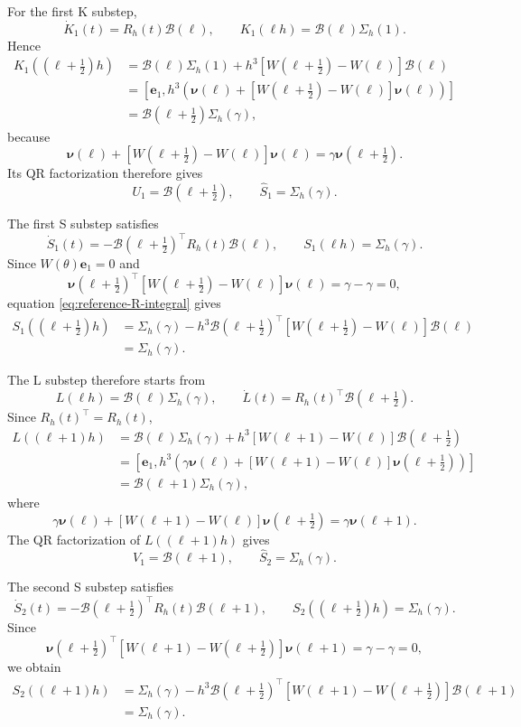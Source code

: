 \documentclass[10pt,a4paper]{amsart}
\numberwithin{equation}{section}
\begin{document}
For the first K substep,
\[
 \dot K_1(t)=R_h(t)\mathcal B(\ell),
 \qquad K_1(\ell h)=\mathcal B(\ell)\Sigma_h(1).
\]
Hence
\begin{align*}
 K_1((\ell+\tfrac12)h)
 &=\mathcal B(\ell)\Sigma_h(1)+h^3
 [W(\ell+\tfrac12)-W(\ell)]\mathcal B(\ell)\\
 &=\left[\boldsymbol e_1,
 h^3\left(\boldsymbol\nu(\ell)
 +[W(\ell+\tfrac12)-W(\ell)]\boldsymbol\nu(\ell)\right)\right]\\
 &=\mathcal B(\ell+\tfrac12)\Sigma_h(\gamma),
\end{align*}
because
\[
 \boldsymbol\nu(\ell)+
 [W(\ell+\tfrac12)-W(\ell)]\boldsymbol\nu(\ell)
 =\gamma\boldsymbol\nu(\ell+\tfrac12).
\]
Its QR factorization therefore gives
\[
 U_1=\mathcal B(\ell+\tfrac12),
 \qquad \widehat S_1=\Sigma_h(\gamma).
\]

The first S substep satisfies
\[
 \dot S_1(t)
 =-\mathcal B(\ell+\tfrac12)^\top R_h(t)\mathcal B(\ell),
 \qquad S_1(\ell h)=\Sigma_h(\gamma).
\]
Since $W(\theta)\boldsymbol e_1=0$ and
\[
 \boldsymbol\nu(\ell+\tfrac12)^\top
 [W(\ell+\tfrac12)-W(\ell)]\boldsymbol\nu(\ell)
 =\gamma-\gamma=0,
\]
equation \eqref{eq:reference-R-integral} gives
\begin{align*}
 S_1((\ell+\tfrac12)h)
 &=\Sigma_h(\gamma)-h^3\mathcal B(\ell+\tfrac12)^\top
 [W(\ell+\tfrac12)-W(\ell)]\mathcal B(\ell)\\
 &=\Sigma_h(\gamma).
\end{align*}

The L substep therefore starts from
\[
 L(\ell h)=\mathcal B(\ell)\Sigma_h(\gamma),
 \qquad \dot L(t)=R_h(t)^\top \mathcal B(\ell+\tfrac12).
\]
Since $R_h(t)^\top=R_h(t)$,
\begin{align*}
 L((\ell+1)h)
 &=\mathcal B(\ell)\Sigma_h(\gamma)+h^3
 [W(\ell+1)-W(\ell)]\mathcal B(\ell+\tfrac12)\\
 &=\left[\boldsymbol e_1,
 h^3\left(\gamma\boldsymbol\nu(\ell)
 +[W(\ell+1)-W(\ell)]\boldsymbol\nu(\ell+\tfrac12)\right)\right]\\
 &=\mathcal B(\ell+1)\Sigma_h(\gamma),
\end{align*}
where
\[
 \gamma\boldsymbol\nu(\ell)+
 [W(\ell+1)-W(\ell)]\boldsymbol\nu(\ell+\tfrac12)
 =\gamma\boldsymbol\nu(\ell+1).
\]
The QR factorization of $L((\ell+1)h)$ gives
\[
 V_1=\mathcal B(\ell+1),
 \qquad \widehat S_2=\Sigma_h(\gamma).
\]

The second S substep satisfies
\[
 \dot S_2(t)
 =-\mathcal B(\ell+\tfrac12)^\top R_h(t)\mathcal B(\ell+1),
 \qquad S_2((\ell+\tfrac12)h)=\Sigma_h(\gamma).
\]
Since
\[
 \boldsymbol\nu(\ell+\tfrac12)^\top
 [W(\ell+1)-W(\ell+\tfrac12)]\boldsymbol\nu(\ell+1)
 =\gamma-\gamma=0,
\]
we obtain
\begin{align*}
 S_2((\ell+1)h)
 &=\Sigma_h(\gamma)-h^3\mathcal B(\ell+\tfrac12)^\top
 [W(\ell+1)-W(\ell+\tfrac12)]\mathcal B(\ell+1)\\
 &=\Sigma_h(\gamma).
\end{align*}
\end{document}
